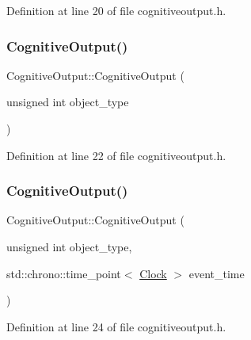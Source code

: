 Definition at line 20 of file cognitiveoutput.\+h.

\mbox{\label{class_cognitive_output_af1fca516a8a90913760e8ac5431f6f70}} 
\subsubsection{\texorpdfstring{Cognitive\+Output()}{CognitiveOutput()}\hspace{0.1cm}{\footnotesize\ttfamily [2/4]}}
{\footnotesize\ttfamily Cognitive\+Output\+::\+Cognitive\+Output (\begin{DoxyParamCaption}\item[{unsigned int}]{object\+\_\+type }\end{DoxyParamCaption})\hspace{0.3cm}{\ttfamily [inline]}}



Definition at line 22 of file cognitiveoutput.\+h.

\mbox{\label{class_cognitive_output_a4751f511d329c66ed80a3c127e5e9e6d}} 
\subsubsection{\texorpdfstring{Cognitive\+Output()}{CognitiveOutput()}\hspace{0.1cm}{\footnotesize\ttfamily [3/4]}}
{\footnotesize\ttfamily Cognitive\+Output\+::\+Cognitive\+Output (\begin{DoxyParamCaption}\item[{unsigned int}]{object\+\_\+type,  }\item[{std\+::chrono\+::time\+\_\+point$<$ \hyperlink{universe_8h_a0ef8d951d1ca5ab3cfaf7ab4c7a6fd80}{Clock} $>$}]{event\+\_\+time }\end{DoxyParamCaption})\hspace{0.3cm}{\ttfamily [inline]}}



Definition at line 24 of file cognitiveoutput.\+h.

\mbox{\label{class_cognitive_output_a9874901c7b49a6bb495d34c84fdbf651}} 
